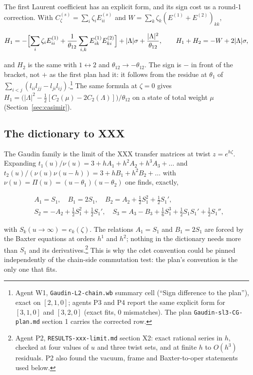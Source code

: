 \documentclass[11pt]{article}
\begin{document}
The first Laurent coefficient has an explicit form, and its sign cost us a round-1 correction.
With $C_\zeta^{(s)}=\sum_i\zeta_iE^{(s)}_{ii}$ and $W=\sum_k\zeta_k(E^{(1)}+E^{(2)})_{kk}$,

\begin{equation}
H_1=-\Bigl[\sum_i\zeta_iE^{(1)}_{ii}+\frac1{\theta_{12}}\sum_{i,k}E^{(1)}_{ik}E^{(2)}_{ki}\Bigr]+|\Lambda|\sigma+\frac{|\Lambda|^2}{\theta_{12}},\qquad H_1+H_2=-W+2|\Lambda|\sigma,\label{eq:H1}
\end{equation}

and $H_2$ is the same with $1\leftrightarrow2$ and $\theta_{12}\to-\theta_{12}$. The sign is $-$ in front of the bracket, not $+$ as the first plan had it: it follows from the residue at $\theta_1$ of $\sum_{i<j}(l_{ii}l_{jj}-l_{ji}l_{ij})$.\footnote{Agent W1, \texttt{Gaudin-\allowbreak{}L2-\allowbreak{}chain.\allowbreak{}wb} summary cell (``Sign difference to the plan''), exact on $[2,1,0]$; agents P3 and P4 report the same explicit form for $[3,1,0]$ and $[3,2,0]$ (exact fits, 0 mismatches).
The plan \texttt{Gaudin-\allowbreak{}sl3-\allowbreak{}CG-\allowbreak{}plan.\allowbreak{}md} section 1 carries the corrected row.} The same formula at $\zeta=0$ gives $H_1=\bigl(|\Lambda|^2-\tfrac12[C_2(\mu)-2C_2(\Lambda)]\bigr)/\theta_{12}$ on a state of total weight $\mu$ (Section~\ref{sec:casimir}).

\subsection{The dictionary to XXX}\label{sec:dict}

The Gaudin family is the limit of the XXX transfer matrices at twist $z=e^{h\zeta}$. Expanding $t_1(u)/\nu(u)=3+hA_1+h^2A_2+h^3A_3+\dots$ and $t_2(u)/(\nu(u)\nu(u-h))=3+hB_1+h^2B_2+\dots$ with $\nu(u)=\Pi(u)=(u-\theta_1)(u-\theta_2)$ one finds, exactly,

\begin{equation}
\begin{aligned}
&A_1=S_1,\quad B_1=2S_1,\quad B_2=A_2+\tfrac12S_1^2+\tfrac12S_1',\\
&S_2=-A_2+\tfrac12S_1^2+\tfrac12S_1',\quad S_3=A_3-B_3+\tfrac16S_1^3+\tfrac12S_1S_1'+\tfrac12S_1'',
\end{aligned}\label{eq:dict}
\end{equation}

with $S_k(u\to\infty)=e_k(\zeta)$. The relations $A_1=S_1$ and $B_1=2S_1$ are forced by the Baxter equations at orders $h^1$ and $h^2$; nothing in the dictionary needs more than $S_1$ and its derivatives.\footnote{Agent P2, \texttt{RESULTS-\allowbreak{}xxx-\allowbreak{}limit.\allowbreak{}md} section X2: exact rational series in $h$, checked at four values of $u$ and three twist sets, and at finite $h$ to $O(h^3)$ residuals.
P2 also found the vacuum, frame and Baxter-to-oper statements used below.} This is why the cdet convention could be pinned independently of the chain-side commutation test: the plan's convention is the only one that fits.
\end{document}
